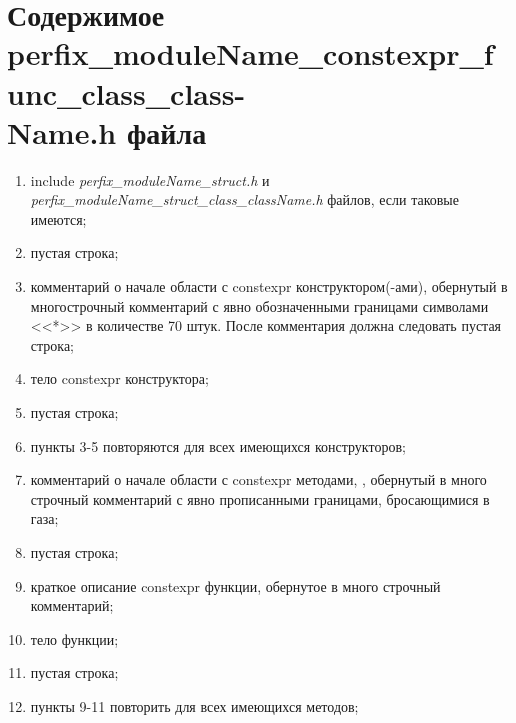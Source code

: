 \section{Содержимое perfix\-\_moduleName\-\_constexpr\-\_func\-\_class\-\_class-\\\-Name.h файла}\label{p:conf:ch}
\begin{enumerate}
	\item include \textit{perfix\_moduleName\_struct.h} и \textit{perfix\_moduleName\_struct\_class\_className.h} файлов, если таковые имеются;
	\item пустая строка;
	\item комментарий о начале области с constexpr конструктором(-ами), обернутый в многострочный комментарий с явно обозначенными границами символами <<*>> в количестве 70 штук. После комментария должна следовать  пустая строка;
	\item тело constexpr конструктора;
	\item пустая строка;
	\item пункты 3-5 повторяются для всех имеющихся конструкторов;
	\item комментарий о начале области с constexpr методами, , обернутый в много строчный комментарий с явно прописанными границами, бросающимися в газа;
	\item пустая строка;
	\item краткое описание constexpr функции, обернутое в много строчный комментарий;
	\item тело функции;
	\item пустая строка;
	\item пункты 9-11 повторить для всех имеющихся методов;
	
\end{enumerate}
